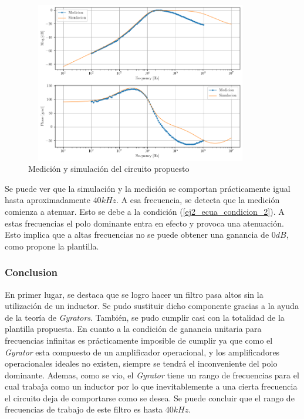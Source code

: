 \begin{figure}[h!]                                                       
    \centering\includegraphics[width=0.9\textwidth, height=7cm]{../Ex2/Resources/ej2_hp_med_and_sim.png}
    \caption{Medición y simulación del circuito propuesto }
    \label{fig:ej2_hp_med_and_sim}
    \end{figure}

Se puede ver que la simulación y la medición se comportan prácticamente igual hasta aproximadamente $40kHz$. A esa frecuencia, se detecta que la medición comienza a atenuar. Esto se debe a la condición (\ref{ej2_ecua_condicion_2}). A estas frecuencias el polo dominante entra en efecto y provoca una atenuación. Esto implica que a altas frecuencias no se puede obtener una ganancia de $0dB$, como propone la plantilla. 



\subsubsection{Conclusion}

En primer lugar, se destaca que se logro hacer un filtro pasa altos sin la utilización de un inductor. Se pudo sustituir dicho componente gracias a la ayuda de la teoría de \textit{Gyrators}. También, se pudo cumplir casi con la totalidad de la plantilla propuesta. En cuanto a la condición de ganancia unitaria para frecuencias infinitas es prácticamente imposible de cumplir ya que como el \textit{Gyrator} esta compuesto de un amplificador operacional, y los amplificadores operacionales ideales no existen, siempre se tendrá el inconveniente del polo dominante. Ademas, como se vio, el \textit{Gyrator} tiene un rango de frecuencias para el cual trabaja como un inductor por lo que inevitablemente a una cierta frecuencia el circuito deja de comportarse como se desea. Se puede concluir que el rango de frecuencias de trabajo de este filtro es hasta $40kHz$. 


